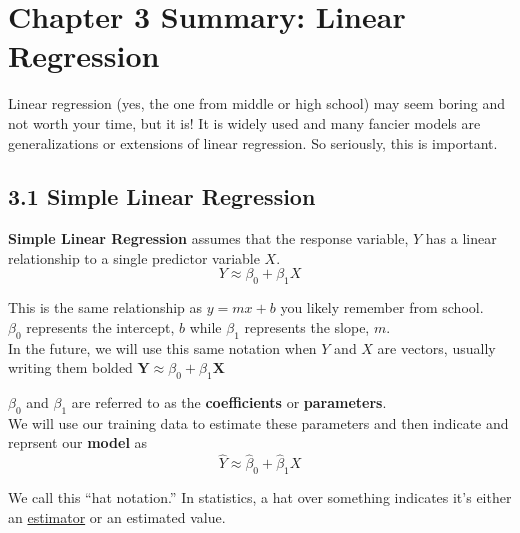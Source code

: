 \providecommand{\tightlist}{%
    \setlength{\itemsep}{0pt}\setlength{\parskip}{0pt}}



    \section*{Chapter 3 Summary: Linear    Regression}\label{chapter-3-summary-linear-regression}

        
        Linear regression (yes, the one from middle or high school) may seem boring and not worth your time, but it is! 
        It is widely used and many    fancier models are generalizations or extensions of linear regression.    So seriously, this is important.
        \subsection*{3.1 Simple Linear Regression}
        \textbf{Simple Linear Regression} assumes that the response variable,
        \(Y\) has a linear relationship to a single predictor variable \(X\). 
        \begin{equation*}
            Y \approx \beta_0 + \beta_1 X
        \end{equation*}
        
        
        \begin{note}
            This is the same relationship as \(y=mx+b\) you likely
            remember from school.\\
            \(\beta_0\) represents the intercept, \(b\) while \(\beta_1\) represents
            the slope, \(m\).\\
            In the future, we will use this same notation when \(Y\) and \(X\) are
            vectors, usually writing them bolded
            \(\mathbf{Y} \approx \beta_0 + \beta_1 \mathbf{X}\)
        \end{note}
        
        \(\beta_0\) and \(\beta_1\) are referred to as the \textbf{coefficients}
        or \textbf{parameters}.\\
        We will use our training data to estimate these parameters and then
        indicate and reprsent our \textbf{model} as 
        \begin{equation*}
            \hat Y \approx \hat \beta_0 + \hat \beta_1 X
        \end{equation*}

        \begin{note}
            We call this ``hat notation.'' In statistics, a hat over something indicates it's either an
            \href{https://en.wikipedia.org/wiki/Estimator}{estimator} or an estimated value.
        \end{note}
        
